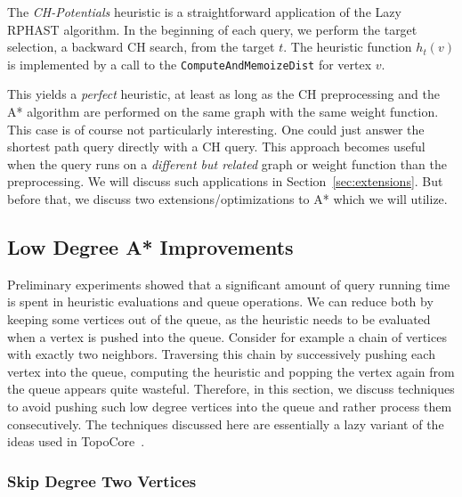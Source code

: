 \documentclass[manuscript,review]{acmart}
\begin{document}
The \emph{CH-Potentials} heuristic is a straightforward application of the Lazy RPHAST algorithm.
In the beginning of each query, we perform the target selection, a backward CH search, from the target $t$.
The heuristic function $h_t(v)$ is implemented by a call to the \texttt{ComputeAndMemoizeDist} for vertex $v$.

This yields a \emph{perfect} heuristic, at least as long as the CH preprocessing and the A* algorithm are performed on the same graph with the same weight function.
This case is of course not particularly interesting.
One could just answer the shortest path query directly with a CH query.
This approach becomes useful when the query runs on a \emph{different but related} graph or weight function than the preprocessing.
We will discuss such applications in Section~\ref{sec:extensions}.
But before that, we discuss two extensions/optimizations to A* which we will utilize.

\subsection{Low Degree A* Improvements}\label{sec:low-deg-improvment}

Preliminary experiments showed that a significant amount of query running time is spent in heuristic evaluations and queue operations.
We can reduce both by keeping some vertices out of the queue, as the heuristic needs to be evaluated when a vertex is pushed into the queue.
Consider for example a chain of vertices with exactly two neighbors.
Traversing this chain by successively pushing each vertex into the queue, computing the heuristic and popping the vertex again from the queue appears quite wasteful.
Therefore, in this section, we discuss techniques to avoid pushing such low degree vertices into the queue and rather process them consecutively.
The techniques discussed here are essentially a lazy variant of the ideas used in TopoCore~\cite{DBLP:conf/gis/DibbeltSW15}.


\subsubsection{Skip Degree Two Vertices}
\end{document}
